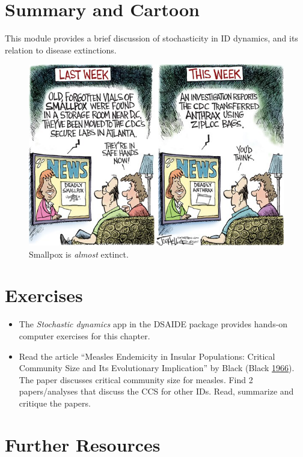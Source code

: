 \documentclass[]{book}
\providecommand{\tightlist}{%
  \setlength{\itemsep}{0pt}\setlength{\parskip}{0pt}}
\theoremstyle{definition}
\theoremstyle{definition}
\theoremstyle{definition}
\theoremstyle{remark}
\begin{document}
\section{Summary and Cartoon}\label{summary-and-cartoon-12}

This module provides a brief discussion of stochasticity in ID dynamics,
and its relation to disease extinctions.

\begin{figure}
\centering
\includegraphics{./images/smallpox.png}
\caption{\label{fig:smallpox}Smallpox is \emph{almost} extinct.}
\end{figure}

\section{Exercises}\label{exercises-12}

\begin{itemize}
\tightlist
\item
  The \emph{Stochastic dynamics} app in the DSAIDE package provides
  hands-on computer exercises for this chapter.
\item
  Read the article ``Measles Endemicity in Insular Populations: Critical
  Community Size and Its Evolutionary Implication'' by Black (Black
  \protect\hyperlink{ref-black66}{1966}). The paper discusses critical
  community size for measles. Find 2 papers/analyses that discuss the
  CCS for other IDs. Read, summarize and critique the papers.
\end{itemize}

\section{Further Resources}\label{further-resources-12}
\end{document}
